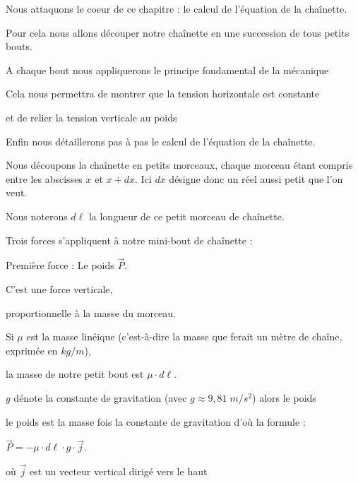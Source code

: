 






\debuttexte


\diapo


\change
Nous attaquons le coeur de ce chapitre : le calcul de l'équation de la chaînette.

\change
Pour cela nous allons découper notre chaînette en une succession de tous petits bouts.

\change
A chaque bout nous appliquerons le principe fondamental de la mécanique

\change
Cela nous permettra de montrer que la tension horizontale est constante

\change
et de relier la tension verticale au poids

\change
Enfin nous détaillerons pas à pas le calcul de l'équation
de la chaînette.


\diapo

Nous découpons la chaînette en petits morceaux, chaque morceau étant 
compris entre les abscisses $x$ et $x+dx$. Ici $dx$ désigne donc un
réel aussi petit que l'on veut.

Nous noterons $d\ell$ la longueur de ce petit morceau de chaînette.

\change
Trois forces s'appliquent à notre mini-bout de chaînette :

\change
Première force : Le poids $\vec P$. 

\change
C'est une force verticale, 

\change
proportionnelle à la masse du morceau.

\change
Si $\mu$ est la masse linéique (c'est-à-dire la masse que ferait un mètre de chaîne, exprimée en $kg/m$),

\change
la masse de notre petit bout est $\mu \cdot d\ell$.

\change
$g$ dénote la constante de gravitation (avec $g \approx 9,81 \; m/s^2$) alors le poids 

le poids est la masse fois la constante de gravitation d'où la formule :

 $\vec P = - \mu\cdot d\ell \cdot g \cdot \vec j$.


où $\vec j$ est un vecteur vertical dirigé vers le haut

